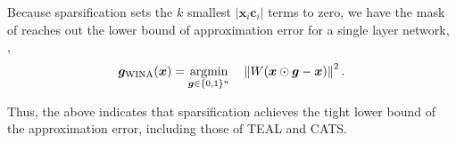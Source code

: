 Because \algacro{} sparsification sets the $k$ smallest $|\bm{x}_i\bm{c}_i|$ terms to zero, we have the mask of \algacro{} reaches out the lower bound of approximation error for a single layer network, \ie,
\begin{equation}
	\bm{g}_{\text{\algacro{}}}(\bm{x})=\argmin_{\bm{g}\in\{0,1\}^{n}}\quad \norm{W(\bm{x}\odot \bm{g} - \bm{x})}^2.
\end{equation}

Thus, the above indicates that \algacro{} sparsification achieves the tight lower bound of the approximation error, including those of TEAL and CATS. 